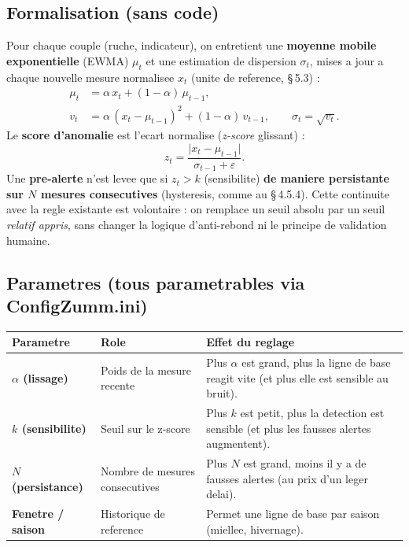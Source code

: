 \subsection{Formalisation (sans code)}
Pour chaque couple (ruche, indicateur), on entretient une \textbf{moyenne mobile
exponentielle} (EWMA) $\mu_t$ et une estimation de dispersion $\sigma_t$, mises
a jour a chaque nouvelle mesure normalisee $x_t$ (unite de reference,
§\,5.3) :
\begin{align}
  \mu_t      &= \alpha\,x_t + (1-\alpha)\,\mu_{t-1}, \\
  v_t        &= \alpha\,(x_t-\mu_{t-1})^2 + (1-\alpha)\,v_{t-1},
                \qquad \sigma_t = \sqrt{v_t}.
\end{align}
Le \textbf{score d'anomalie} est l'ecart normalise (\emph{z-score} glissant) :
\begin{equation}
  z_t = \frac{\lvert x_t - \mu_{t-1}\rvert}{\sigma_{t-1} + \varepsilon}.
\end{equation}
Une \textbf{pre-alerte} n'est levee que si $z_t > k$ (sensibilite) \textbf{de
maniere persistante sur $N$ mesures consecutives} (hysteresis, comme au
§\,4.5.4). Cette continuite avec la regle existante est volontaire : on remplace
un seuil absolu par un seuil \emph{relatif appris}, sans changer la logique
d'anti-rebond ni le principe de validation humaine.

\subsection{Parametres (tous parametrables via ConfigZumm.ini)}
\begin{xltabular}{\textwidth}{>{\bfseries}p{2.6cm} p{2.4cm} X}
\toprule
\textbf{Parametre} & \textbf{Role} & \textbf{Effet du reglage} \\
\midrule
\endhead
$\alpha$ (lissage) & Poids de la mesure recente & Plus $\alpha$ est grand, plus la ligne de base reagit vite (et plus elle est sensible au bruit). \\
$k$ (sensibilite) & Seuil sur le z-score & Plus $k$ est petit, plus la detection est sensible (et plus les fausses alertes augmentent). \\
$N$ (persistance) & Nombre de mesures consecutives & Plus $N$ est grand, moins il y a de fausses alertes (au prix d'un leger delai). \\
Fenetre / saison & Historique de reference & Permet une ligne de base par saison (miellee, hivernage). \\
\bottomrule
\end{xltabular}

